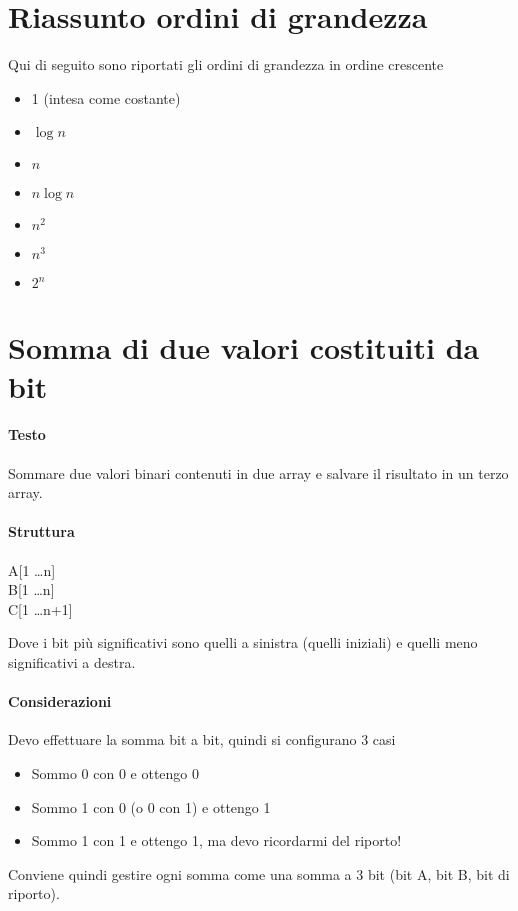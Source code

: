 \section{Riassunto ordini di grandezza}
Qui di seguito sono riportati gli ordini di grandezza in ordine crescente 
\begin{itemize}
    \item 1 (intesa come costante)
    \item $\log n$
    \item $n$
    \item $n\log n$
    \item $n^2$
    \item $n^3$
    \item $2^n$
\end{itemize}

\section{Somma di due valori costituiti da bit}
\paragraph*{Testo} Sommare due valori binari contenuti in due array e salvare il risultato
in un terzo array.
\paragraph*{Struttura}
\begin{center}
    A[1 \dots n]\\
    B[1 \dots n]\\
    C[1 \dots n+1]
\end{center}
Dove i bit più significativi sono quelli a sinistra (quelli iniziali) e quelli meno
significativi a destra.
\paragraph*{Considerazioni} Devo effettuare la somma bit a bit, quindi si configurano 3 casi
\begin{itemize}
    \item Sommo 0 con 0 e ottengo 0
    \item Sommo 1 con 0 (o 0 con 1) e ottengo 1
    \item Sommo 1 con 1 e ottengo 1, ma devo ricordarmi del riporto!
\end{itemize}
Conviene quindi gestire ogni somma come una somma a 3 bit (bit A, bit B, bit di riporto).
